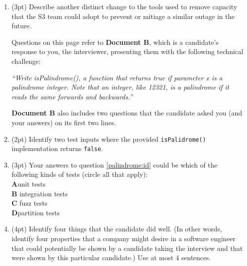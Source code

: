 \documentclass{report}
\newif\ifkey
\newcommand{\correct}[1]{\ifkey\color{red}\textbf{#1}\color{black}\else\textbf{#1}\fi\xspace}
\newcommand{\answerlong}[1]{\ifkey\color{red}\textbf{#1}\color{black}\else\vspace{0.5in}\fi\xspace}
\newcommand*{\pts}[1]{\addtocounter{points}{#1}(#1pt)}
\begin{document}
\begin{spacing}{1.4}
\begin{enumerate}[leftmargin=*]
    \item \pts{3} Describe another distinct change to the tools used to remove capacity that the S3 team could adopt to prevent
      or mitiage a similar outage in the future. \\
      \answerlong{See the previous question.}
      
    \newpage

    Questions on this page refer to \textbf{Document B}, which is a candidate's response to you,
    the interviewer, presenting them with the following technical challenge:

    \emph{
      ``Write isPalindrome(), a function that
      returns true if parameter x is a palindrome integer. Note that an integer, like 12321, is a palindrome if it reads the same
      forwards and backwards.''
    }
      
    \textbf{Document B} also includes two questions that the candidate asked you (and your answers) on its first two lines.

  \item \label{palindrome:id} \pts{2} Identify two test inputs where the provided \lstinline{isPalidrome()} implementation returns \lstinline{false}.\\
    \answerlong{Answers will vary. Student solutions must not be a palindrome. {{123}}, {{10}} are potential answers that return
      false.}

  \item \pts{3} Your answers to question \ref{palindrome:id} could be which of the following kinds of tests (circle all that apply):
    \\ \correct{A}\hspace{0.2in}unit tests
    \\ \textbf{B}\hspace{0.2in} integration tests
    \\ \textbf{C}\hspace{0.2in} fuzz tests
    \\ \correct{D}\hspace{0.2in}partition tests

  \item \pts{4}  Identify four things that the candidate did well. (In other words, identify four properties that a company might
desire in a software engineer that could potentially be shown by a candidate taking the interview and that were shown by this
particular candidate.) Use at most 4 sentences.\\
\answerlong{Answers will vary. Potential solutions include the following:
1. The candidate provided inline comments explaining some of their code.
2. The candidate asked relevant questions regarding code functionality.
3. The candidate has consistent indentation.
4. The candidate used a descriptive variable name.}


\end{enumerate}
\end{spacing}
\end{document}
